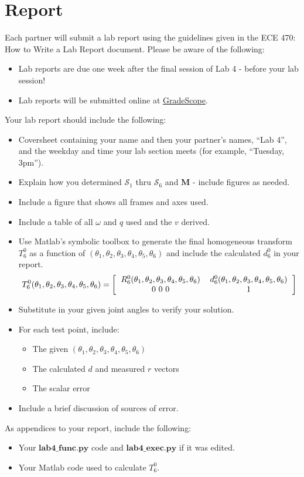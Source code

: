 \section{Report}
Each partner will submit a lab report using the guidelines given in the ECE 470: How to Write a Lab Report document.  Please be aware of the following:
\begin{itemize}
    \item Lab reports are due one week after the final session of Lab 4 - before your lab session!
    \item Lab reports will be submitted online at \href{https://www.gradescope.com}{GradeScope}.
\end{itemize}
Your lab report should include the following:
\begin{itemize}
\item Coversheet containing your name and then your partner's names, ``Lab 4'', and the weekday and time your lab section meets (for example, ``Tuesday, 3pm'').
\item Explain how you determined $\mathcal{S}_{1}$ thru $\mathcal{S}_{6}$ and $\textbf{M}$ - include figures as needed.
\item Include a figure that shows all frames and axes used.
\item Include a table of all $\omega$ and $q$ used and the $v$ derived.

 \item Use Matlab's symbolic toolbox to generate the final homogeneous transform $T^{0}_{6}$ as a function of $\left(\theta_{1},\theta_{2},\theta_{3},\theta_{4},\theta_{5},\theta_{6}\right)$ and include the calculated $d^{0}_{6}$ in your report.\\

\[
T^0_6(\theta_1,\theta_2,\theta_3,\theta_4,\theta_5,\theta_6) = \left[
\begin{tabular}{cc}
$R^0_6(\theta_1,\theta_2,\theta_3,\theta_4,\theta_5,\theta_6)$ & $d^0_6(\theta_1,\theta_2,\theta_3,\theta_4,\theta_5,\theta_6)$ \\
0 0 0 & 1
\end{tabular}
\right]
\]
\item Substitute in your given joint angles to verify your solution.
    \item For each test point, include:
    \begin{itemize}
        \item The given $\left(\theta_{1},\theta_{2},\theta_{3},\theta_{4},\theta_{5},\theta_{6}\right)$
        \item The calculated $d$ and measured $r$ vectors
        \item The scalar error
    \end{itemize}
    \item Include a brief discussion of sources of error.
\end{itemize}
As appendices to your report, include the following:
\begin{itemize}
    \item Your $\textbf{lab4\_func.py}$ code and $\textbf{lab4\_exec.py}$ if it was edited.
    \item Your Matlab code used to calculate $T^{0}_{6}$.
\end{itemize}


